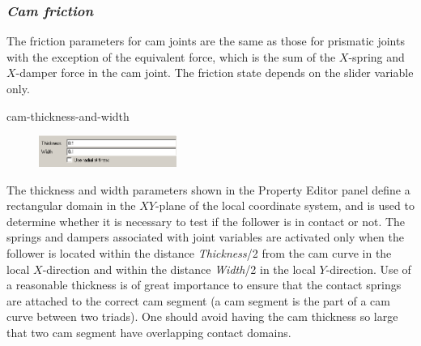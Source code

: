 
\subsubsection{\sl\textbf{Cam friction}}

The friction parameters for cam joints are the same as those for
prismatic joints with the exception of the equivalent force,
which is the sum of the $X$-spring and $X$-damper force in the cam joint.
The friction state depends on the slider variable only.

              {cam-thickness-and-width}

\begin{figure}
  \vspace{-4.5mm}
  \includegraphics[width=0.4\textwidth]{Figures/4-JointPropCamFields}
\end{figure}

The thickness and width parameters shown in the Property Editor panel define a
rectangular domain in the $XY$-plane of the local coordinate system, and is used
to determine whether it is necessary to test if the follower is in contact or not.
The springs and dampers associated with joint variables are activated only when
the follower is located within the distance {\sl Thickness}/2 from the cam curve
in the local $X$-direction and within the distance {\sl Width}/2 in the local
$Y$-direction. Use of a reasonable thickness is of great importance
to ensure that the contact springs are attached to the correct cam segment
(a cam segment is the part of a cam curve between two triads).
One should avoid having the cam thickness so large that two cam segment have
overlapping contact domains.

